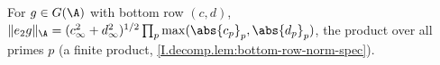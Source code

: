 For $g\in G(\A)$ with bottom row $(c,d)$, $\|e_2g\|_\A=(c_\infty^2+d_\infty^2)^{1/2}\prod_p\max(\abs{c_p}_p,\abs{d_p}_p)$, the product over all primes $p$ (a finite product, \cref{I.decomp.lem:bottom-row-norm-spec}).
